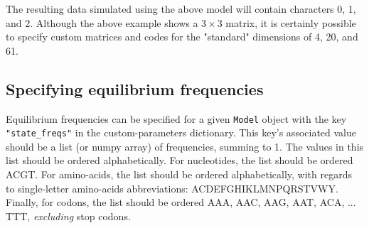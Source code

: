 \documentclass{article}
\newcommand{\code}[1]{\texttt{\small{#1}}}
\begin{document}
The resulting data simulated using the above model will contain characters 0, 1, and 2. Although the above example shows a $3\times3$ matrix, it is certainly possible to specify custom matrices and codes for the "standard" dimensions of 4, 20, and 61.



\subsection{Specifying equilibrium frequencies}\label{sec:freqs}

Equilibrium frequencies can be specified for a given \code{Model} object with the key \code{"state\_freqs"} in the custom-parameters dictionary. This key's associated value should be a list (or numpy array) of frequencies, summing to 1. The values in this list should be ordered alphabetically. For nucleotides, the list should be ordered ACGT. For amino-acids, the list should be ordered alphabetically, with regards to single-letter amino-acids abbreviations: ACDEFGHIKLMNPQRSTVWY. Finally, for codons, the list should be ordered AAA, AAC, AAG, AAT, ACA, ... TTT, \emph{excluding} stop codons.
\end{document}
